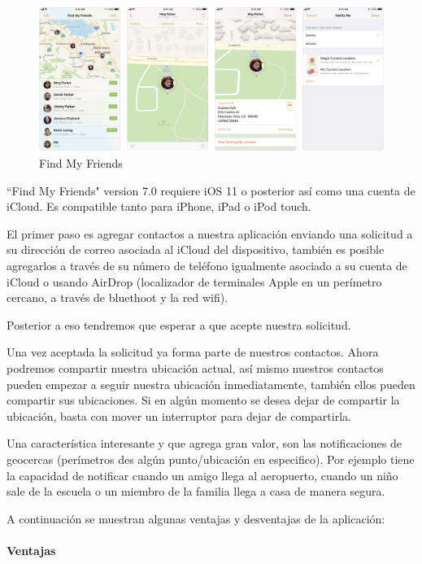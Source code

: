 \begin{figure}[bp!]
	\centering
	\includegraphics[width=5in]{imgs/apple_findmyfriends}
	  \caption{Find My Friends}
\end{figure}

``Find My Friends" version 7.0 requiere iOS 11 o posterior así como una cuenta de iCloud. Es compatible tanto para iPhone, iPad o iPod touch.

El primer paso es agregar contactos a nuestra aplicación enviando una solicitud a su dirección de correo asociada al iCloud del dispositivo, también es posible agregarlos a través de su número de teléfono igualmente asociado a su cuenta de iCloud o usando AirDrop (localizador de terminales Apple en un perímetro cercano, a través de bluethoot y la red wifi).

Posterior a eso tendremos que esperar a que acepte nuestra solicitud.

Una vez aceptada la solicitud ya forma parte de nuestros contactos. Ahora podremos compartir nuestra ubicación actual, así mismo nuestros contactos pueden empezar a seguir nuestra ubicación inmediatamente, también ellos pueden compartir sus ubicaciones. Si en algún momento se desea dejar de compartir la ubicación, basta con mover un interruptor para dejar de compartirla.

Una característica interesante y que agrega gran valor, son las notificaciones de geocercas (perímetros des algún punto/ubicación en especifico). Por ejemplo tiene la capacidad de notificar cuando un amigo llega al aeropuerto, cuando un niño sale de la escuela o un miembro de la familia llega a casa de manera segura. \cite{findmyfriends}

A continuación se muestran algunas ventajas y desventajas de la aplicación:

\paragraph{Ventajas}

